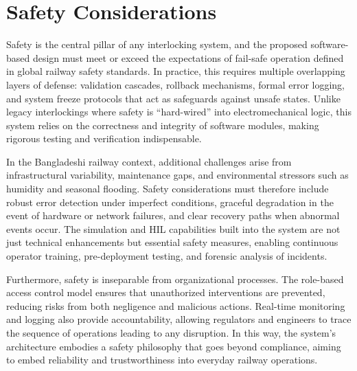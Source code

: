 \section{Safety Considerations}
\label{sec:outro:safety}

Safety is the central pillar of any interlocking system, and the proposed software-based design must meet or exceed the expectations of fail-safe operation defined in global railway safety standards. In practice, this requires multiple overlapping layers of defense: validation cascades, rollback mechanisms, formal error logging, and system freeze protocols that act as safeguards against unsafe states. Unlike legacy interlockings where safety is “hard-wired” into electromechanical logic, this system relies on the correctness and integrity of software modules, making rigorous testing and verification indispensable.

In the Bangladeshi railway context, additional challenges arise from infrastructural variability, maintenance gaps, and environmental stressors such as humidity and seasonal flooding. Safety considerations must therefore include robust error detection under imperfect conditions, graceful degradation in the event of hardware or network failures, and clear recovery paths when abnormal events occur. The simulation and HIL capabilities built into the system are not just technical enhancements but essential safety measures, enabling continuous operator training, pre-deployment testing, and forensic analysis of incidents.

Furthermore, safety is inseparable from organizational processes. The role-based access control model ensures that unauthorized interventions are prevented, reducing risks from both negligence and malicious actions. Real-time monitoring and logging also provide accountability, allowing regulators and engineers to trace the sequence of operations leading to any disruption. In this way, the system’s architecture embodies a safety philosophy that goes beyond compliance, aiming to embed reliability and trustworthiness into everyday railway operations.